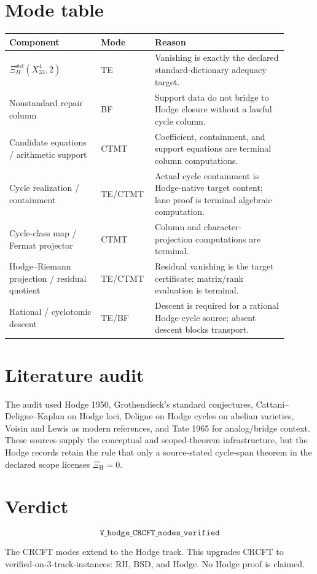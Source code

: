 \documentclass[11pt]{article}
\newcommand{\XiH}{\Xi_{\mathrm H}}
\begin{document}
\section{Mode table}

\begin{center}
\begin{tabular}{p{0.31\linewidth}p{0.14\linewidth}p{0.45\linewidth}}
\toprule
Component & Mode & Reason\\
\midrule
\(\Xi_H^{\mathrm{std}}(X^4_{33},2)\) & TE & Vanishing is exactly the declared standard-dictionary adequacy target.\\
Nonstandard repair column & BF & Support data do not bridge to Hodge closure without a lawful cycle column.\\
Candidate equations / arithmetic support & CTMT & Coefficient, containment, and support equations are terminal column computations.\\
Cycle realization / containment & TE/CTMT & Actual cycle containment is Hodge-native target content; lane proof is terminal algebraic computation.\\
Cycle-class map / Fermat projector & CTMT & Column and character-projection computations are terminal.\\
Hodge--Riemann projection / residual quotient & TE/CTMT & Residual vanishing is the target certificate; matrix/rank evaluation is terminal.\\
Rational / cyclotomic descent & TE/BF & Descent is required for a rational Hodge-cycle source; absent descent blocks transport.\\
\bottomrule
\end{tabular}
\end{center}

\section{Literature audit}

The audit used Hodge 1950, Grothendieck's standard conjectures, Cattani--Deligne--Kaplan on Hodge loci, Deligne on Hodge cycles on abelian varieties, Voisin and Lewis as modern references, and Tate 1965 for analog/bridge context. These sources supply the conceptual and scoped-theorem infrastructure, but the Hodge records retain the rule that only a source-stated cycle-span theorem in the declared scope licenses \(\XiH=0\).

\section{Verdict}

\[
\boxed{\texttt{V\_hodge\_CRCFT\_modes\_verified}}
\]

The CRCFT modes extend to the Hodge track. This upgrades CRCFT to verified-on-3-track-instances: RH, BSD, and Hodge. No Hodge proof is claimed.
\end{document}
